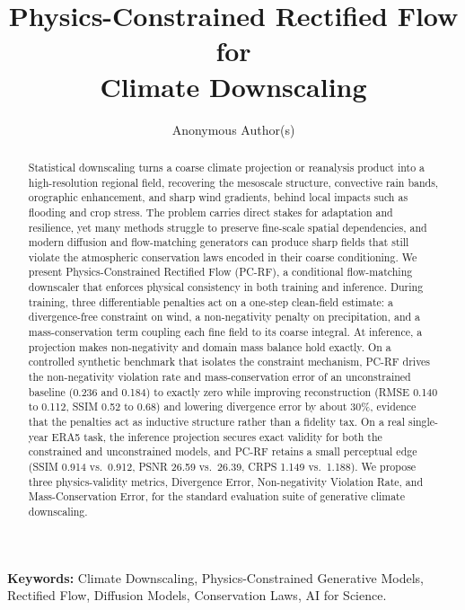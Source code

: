 \documentclass[letterpaper,withtimes]{easychair}
\title{Physics-Constrained Rectified Flow for\\ Climate Downscaling}
\author{Anonymous Author(s)}
\institute{Anonymous Institution}
\newcommand{\pcrf}{\textsc{PC-RF}\xspace}
\begin{document}
\maketitle

\begin{abstract}
Statistical downscaling turns a coarse climate projection or reanalysis product into a high-resolution regional field, recovering the mesoscale structure, convective rain bands, orographic enhancement, and sharp wind gradients, behind local impacts such as flooding and crop stress. The problem carries direct stakes for adaptation and resilience, yet many methods struggle to preserve fine-scale spatial dependencies, and modern diffusion and flow-matching generators can produce sharp fields that still violate the atmospheric conservation laws encoded in their coarse conditioning. We present Physics-Constrained Rectified Flow (\pcrf), a conditional flow-matching downscaler that enforces physical consistency in both training and inference. During training, three differentiable penalties act on a one-step clean-field estimate: a divergence-free constraint on wind, a non-negativity penalty on precipitation, and a mass-conservation term coupling each fine field to its coarse integral. At inference, a projection makes non-negativity and domain mass balance hold exactly. On a controlled synthetic benchmark that isolates the constraint mechanism, \pcrf drives the non-negativity violation rate and mass-conservation error of an unconstrained baseline (0.236 and 0.184) to exactly zero while improving reconstruction (RMSE 0.140 to 0.112, SSIM 0.52 to 0.68) and lowering divergence error by about 30\%, evidence that the penalties act as inductive structure rather than a fidelity tax. On a real single-year ERA5 task, the inference projection secures exact validity for both the constrained and unconstrained models, and \pcrf retains a small perceptual edge (SSIM 0.914 vs.\ 0.912, PSNR 26.59 vs.\ 26.39, CRPS 1.149 vs.\ 1.188). We propose three physics-validity metrics, Divergence Error, Non-negativity Violation Rate, and Mass-Conservation Error, for the standard evaluation suite of generative climate downscaling.
\end{abstract}

\noindent\textbf{Keywords:} Climate Downscaling, Physics-Constrained Generative Models, Rectified Flow, Diffusion Models, Conservation Laws, AI for Science.
\end{document}
